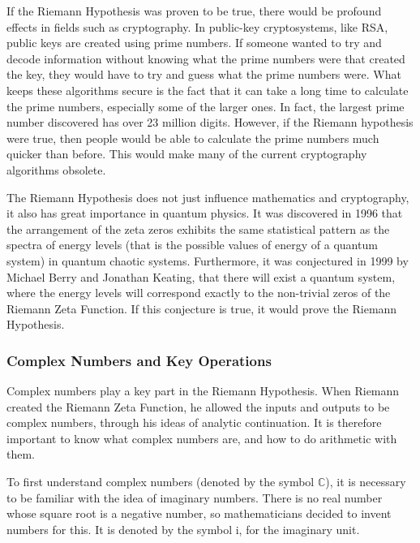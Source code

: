 \documentclass[12pt]{article}
\begin{document}
If the Riemann Hypothesis was proven to be true, there would be profound effects in fields such as cryptography. In public-key cryptosystems, like RSA, public keys are created using prime numbers. If someone wanted to try and decode information without knowing what the prime numbers were that created the key, they would have to try and guess what the prime numbers were. What keeps these algorithms secure is the fact that it can take a long time to calculate the prime numbers, especially some of the larger ones. In fact, the largest prime number discovered has over 23 million digits. However, if the Riemann hypothesis were true, then people would be able to calculate the prime numbers much quicker than before. This would make many of the current cryptography algorithms obsolete.

The Riemann Hypothesis does not just influence mathematics and cryptography, it also has great importance in quantum physics. It was discovered in 1996 that the arrangement of the zeta zeros exhibits the same statistical pattern as the spectra of energy levels (that is the possible values of energy of a quantum system) in quantum chaotic systems. Furthermore, it was conjectured in 1999 by Michael Berry and Jonathan Keating, that there will exist a quantum system, where the energy levels will correspond exactly to the non-trivial zeros of the Riemann Zeta Function. If this conjecture is true, it would prove the Riemann Hypothesis.

\subsubsection{Complex Numbers and Key Operations}
Complex numbers play a key part in the Riemann Hypothesis. When Riemann created the Riemann Zeta Function, he allowed the inputs and outputs to be complex numbers, through his ideas of analytic continuation. It is therefore important to know what complex numbers are, and how to do arithmetic with them.

To first understand complex numbers (denoted by the symbol $\mathbb{C}$), it is necessary to be familiar with the idea of imaginary numbers. There is no real number whose square root is a negative number, so mathematicians decided to invent numbers for this. It is denoted by the symbol i, for the imaginary unit.
\end{document}
